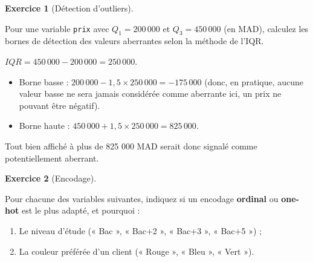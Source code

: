 \documentclass[
  french,
  letterpaper,
  open=any]{scrbook}
\providecommand{\tightlist}{%
  \setlength{\itemsep}{0pt}\setlength{\parskip}{0pt}}
\theoremstyle{definition}
\theoremstyle{definition}
\newtheorem{exercise}{Exercice}[section]
\theoremstyle{remark}
\begin{document}
\begin{exercise}[Détection
d'outliers]\protect\hypertarget{exr-prep-2}{}\label{exr-prep-2}

Pour une variable \texttt{prix} avec \(Q_1 = 200\,000\) et
\(Q_3 = 450\,000\) (en MAD), calculez les bornes de détection des
valeurs aberrantes selon la méthode de l'IQR.

\end{exercise}

\begin{tcolorbox}[enhanced jigsaw, arc=.35mm, bottomrule=.15mm, bottomtitle=1mm, breakable, colback=white, colbacktitle=quarto-callout-tip-color!10!white, colframe=quarto-callout-tip-color-frame, coltitle=black, left=2mm, leftrule=.75mm, opacityback=0, opacitybacktitle=0.6, rightrule=.15mm, title=\textcolor{quarto-callout-tip-color}{\faLightbulb}\hspace{0.5em}{Solution de l'exercice Exercice~\ref{exr-prep-2}}, titlerule=0mm, toprule=.15mm, toptitle=1mm]

\(IQR = 450\,000 - 200\,000 = 250\,000\).

\begin{itemize}
\tightlist
\item
  Borne basse : \(200\,000 - 1{,}5 \times 250\,000 = -175\,000\) (donc,
  en pratique, aucune valeur basse ne sera jamais considérée comme
  aberrante ici, un prix ne pouvant être négatif).
\item
  Borne haute : \(450\,000 + 1{,}5 \times 250\,000 = 825\,000\).
\end{itemize}

Tout bien affiché à plus de 825 000 MAD serait donc signalé comme
potentiellement aberrant.

\end{tcolorbox}

\begin{exercise}[Encodage]\protect\hypertarget{exr-prep-3}{}\label{exr-prep-3}

Pour chacune des variables suivantes, indiquez si un encodage
\textbf{ordinal} ou \textbf{one-hot} est le plus adapté, et pourquoi :

\begin{enumerate}
\def\labelenumi{\alph{enumi}.}
\tightlist
\item
  Le niveau d'étude (« Bac », « Bac+2 », « Bac+3 », « Bac+5 ») ;
\item
  La couleur préférée d'un client (« Rouge », « Bleu », « Vert »).
\end{enumerate}

\end{exercise}
\end{document}
